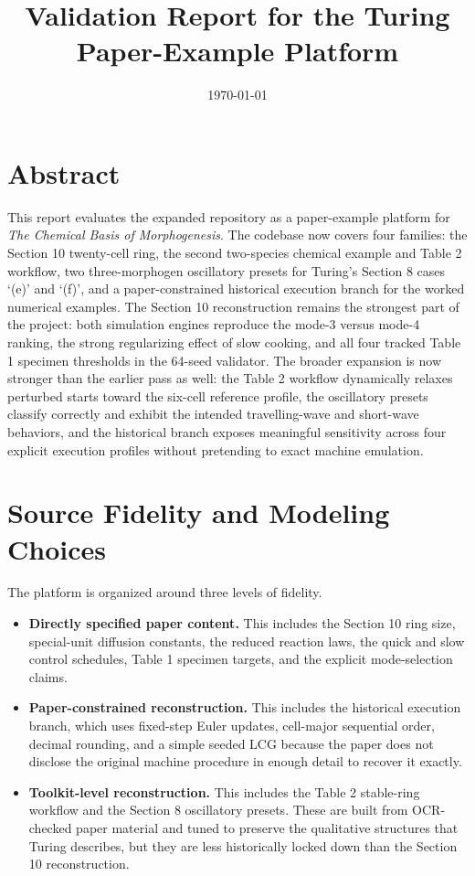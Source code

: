 \documentclass[11pt]{article}
\title{Validation Report for the Turing Paper-Example Platform}
\author{}
\date{\today}
\begin{document}
\maketitle

\section*{Abstract}
This report evaluates the expanded repository as a paper-example platform for \emph{The Chemical Basis of Morphogenesis}. The codebase now covers four families: the Section 10 twenty-cell ring, the second two-species chemical example and Table 2 workflow, two three-morphogen oscillatory presets for Turing's Section 8 cases `(e)' and `(f)', and a paper-constrained historical execution branch for the worked numerical examples. The Section 10 reconstruction remains the strongest part of the project: both simulation engines reproduce the mode-3 versus mode-4 ranking, the strong regularizing effect of slow cooking, and all four tracked Table 1 specimen thresholds in the 64-seed validator. The broader expansion is now stronger than the earlier pass as well: the Table 2 workflow dynamically relaxes perturbed starts toward the six-cell reference profile, the oscillatory presets classify correctly and exhibit the intended travelling-wave and short-wave behaviors, and the historical branch exposes meaningful sensitivity across four explicit execution profiles without pretending to exact machine emulation.

\section*{Source Fidelity and Modeling Choices}
The platform is organized around three levels of fidelity.
\begin{itemize}
    \item \textbf{Directly specified paper content.} This includes the Section 10 ring size, special-unit diffusion constants, the reduced reaction laws, the quick and slow control schedules, Table 1 specimen targets, and the explicit mode-selection claims.
    \item \textbf{Paper-constrained reconstruction.} This includes the historical execution branch, which uses fixed-step Euler updates, cell-major sequential order, decimal rounding, and a simple seeded LCG because the paper does not disclose the original machine procedure in enough detail to recover it exactly.
    \item \textbf{Toolkit-level reconstruction.} This includes the Table 2 stable-ring workflow and the Section 8 oscillatory presets. These are built from OCR-checked paper material and tuned to preserve the qualitative structures that Turing describes, but they are less historically locked down than the Section 10 reconstruction.
\end{itemize}
\end{document}
